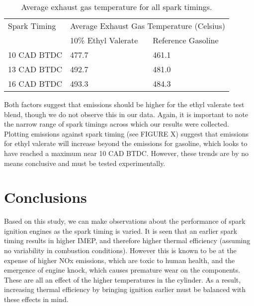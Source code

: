 \begin{table}[H]
    \begin{center}
        \begin{tabular}{@{}lll@{}}
            \toprule
            Spark Timing   & \multicolumn{2}{c}{Average Exhaust Gas Temperature (Celsius)}                      \\
            \cmidrule{2-3} & 10\% Ethyl Valerate                                           & Reference Gasoline \\
            \midrule
            10 CAD BTDC    & 477.7                                                         & 461.1              \\
            13 CAD BTDC    & 492.7                                                         & 481.0              \\
            16 CAD BTDC    & 493.3                                                         & 484.3              \\
            \bottomrule
        \end{tabular}
        \caption{Average exhaust gas temperature for all spark timings.}
        \label{q7-t1}
    \end{center}
\end{table}
Both factors suggest that  emissions should be higher for the ethyl valerate test blend, though we do not observe this in our data. Again, it is important to note the narrow range of spark timings across which our results were collected. Plotting  emissions against spark timing (see FIGURE X) suggest that  emissions for ethyl valerate will increase beyond the  emissions for gasoline, which looks to have reached a maximum near 10 CAD BTDC. However, these trends are by no means conclusive and must be tested experimentally.
\section{Conclusions}
Based on this study, we can make observations about the performance of spark ignition engines as the spark timing is varied. It is seen that an earlier spark timing results in higher IMEP, and therefore higher thermal efficiency (assuming no variability in combustion conditions). However this is known to be at the expense of higher NOx emissions, which are toxic to human health, and the emergence of engine knock, which causes premature wear on the components. These are all an effect of the higher temperatures in the cylinder. As a result, increasing thermal efficiency by bringing ignition earlier must be balanced with these effects in mind.

